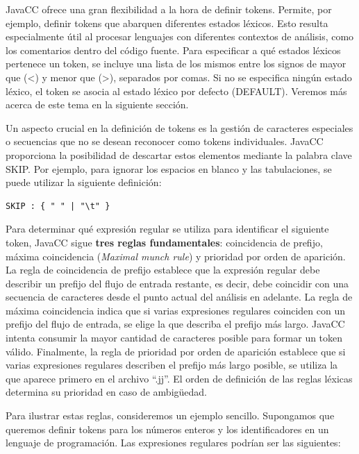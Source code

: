 JavaCC ofrece una gran flexibilidad a la hora de definir tokens. Permite, por ejemplo, definir tokens que abarquen diferentes estados léxicos. Esto resulta especialmente útil al procesar lenguajes con diferentes contextos de análisis, como los comentarios dentro del código fuente. Para especificar a qué estados léxicos pertenece un token, se incluye una lista de los mismos entre los signos de mayor que (<) y menor que (>), separados por comas. Si no se especifica ningún estado léxico, el token se asocia al estado léxico por defecto (DEFAULT). Veremos más acerca de este tema en la siguiente sección.

Un aspecto crucial en la definición de tokens es la gestión de caracteres especiales o secuencias que no se desean reconocer como tokens individuales. JavaCC proporciona la posibilidad de descartar estos elementos mediante la palabra clave SKIP. Por ejemplo, para ignorar los espacios en blanco y las tabulaciones, se puede utilizar la siguiente definición:

\lstset{inputencoding=utf8/latin1}
\begin{lstlisting}
SKIP : { " " | "\t" }
\end{lstlisting}

Para determinar qué expresión regular se utiliza para identificar el siguiente token, JavaCC sigue \textbf{tres reglas fundamentales}: coincidencia de prefijo, máxima coincidencia (\textit{Maximal munch rule}) y prioridad por orden de aparición. La regla de coincidencia de prefijo establece que la expresión regular debe describir un prefijo del flujo de entrada restante, es decir, debe coincidir con una secuencia de caracteres desde el punto actual del análisis en adelante. La regla de máxima coincidencia indica que si varias expresiones regulares coinciden con un prefijo del flujo de entrada, se elige la que describa el prefijo más largo. JavaCC intenta consumir la mayor cantidad de caracteres posible para formar un token válido. Finalmente, la regla de prioridad por orden de aparición establece que si varias expresiones regulares describen el prefijo más largo posible, se utiliza la que aparece primero en el archivo ``.jj''. El orden de definición de las reglas léxicas determina su prioridad en caso de ambigüedad.

Para ilustrar estas reglas, consideremos un ejemplo sencillo. Supongamos que queremos definir tokens para los números enteros y los identificadores en un lenguaje de programación. Las expresiones regulares podrían ser las siguientes:

